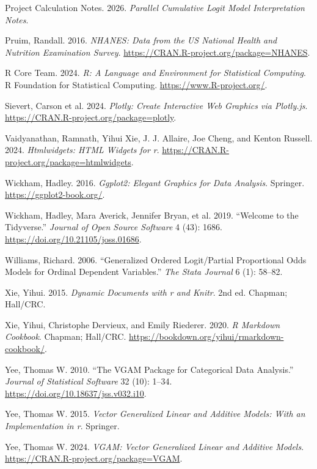 \documentclass{article}
\newlength{\cslhangindent}
\newenvironment{CSLReferences}[2] %
 {\begin{list}{}{%
  \setlength{\itemindent}{0pt}
  \setlength{\leftmargin}{0pt}
  \setlength{\parsep}{0pt}
  \ifodd #1
   \setlength{\leftmargin}{\cslhangindent}
   \setlength{\itemindent}{-1\cslhangindent}
  \fi
  \setlength{\itemsep}{#2\baselineskip}}}
 {\end{list}}
\begin{document}
\begin{CSLReferences}{1}{1}
Project Calculation Notes. 2026. \emph{Parallel Cumulative Logit Model
Interpretation Notes}.

Pruim, Randall. 2016. \emph{NHANES: Data from the US National Health and
Nutrition Examination Survey}.
\url{https://CRAN.R-project.org/package=NHANES}.

R Core Team. 2024. \emph{R: A Language and Environment for Statistical
Computing}. R Foundation for Statistical Computing.
\url{https://www.R-project.org/}.

{Sievert, Carson et al.} 2024. \emph{Plotly: Create Interactive Web
Graphics via Plotly.js}.
\url{https://CRAN.R-project.org/package=plotly}.

Vaidyanathan, Ramnath, Yihui Xie, J. J. Allaire, Joe Cheng, and Kenton
Russell. 2024. \emph{Htmlwidgets: HTML Widgets for r}.
\url{https://CRAN.R-project.org/package=htmlwidgets}.

Wickham, Hadley. 2016. \emph{Ggplot2: Elegant Graphics for Data
Analysis}. Springer. \url{https://ggplot2-book.org/}.

Wickham, Hadley, Mara Averick, Jennifer Bryan, et al. 2019. {``Welcome
to the Tidyverse.''} \emph{Journal of Open Source Software} 4 (43):
1686. \url{https://doi.org/10.21105/joss.01686}.

Williams, Richard. 2006. {``Generalized Ordered Logit/Partial
Proportional Odds Models for Ordinal Dependent Variables.''} \emph{The
Stata Journal} 6 (1): 58--82.

Xie, Yihui. 2015. \emph{Dynamic Documents with r and Knitr}. 2nd ed.
Chapman; Hall/CRC.

Xie, Yihui, Christophe Dervieux, and Emily Riederer. 2020. \emph{R
Markdown Cookbook}. Chapman; Hall/CRC.
\url{https://bookdown.org/yihui/rmarkdown-cookbook/}.

Yee, Thomas W. 2010. {``The VGAM Package for Categorical Data
Analysis.''} \emph{Journal of Statistical Software} 32 (10): 1--34.
\url{https://doi.org/10.18637/jss.v032.i10}.

Yee, Thomas W. 2015. \emph{Vector Generalized Linear and Additive
Models: With an Implementation in r}. Springer.

Yee, Thomas W. 2024. \emph{VGAM: Vector Generalized Linear and Additive
Models}. \url{https://CRAN.R-project.org/package=VGAM}.

\end{CSLReferences}



\end{document}
